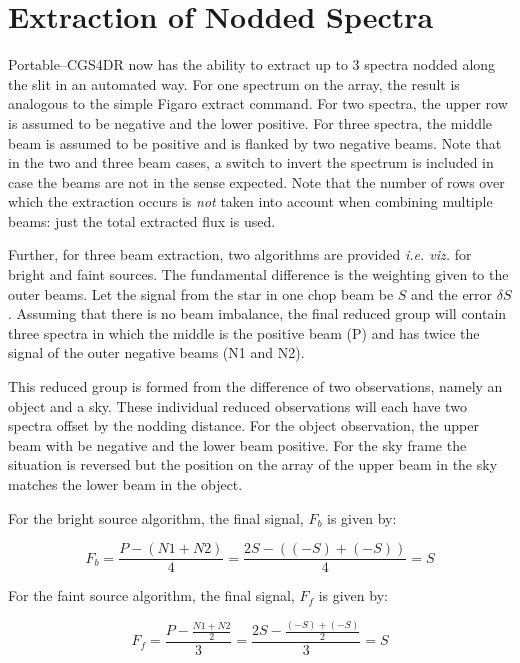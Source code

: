 \documentclass[a4paper]{book}
\renewcommand{\_}{{\tt\char'137}}
\begin{document}
\section{Extraction of Nodded Spectra}
Portable--CGS4DR now has the ability to extract up to 3 spectra nodded
along the slit in an automated way. For one spectrum on the array, the
result is analogous to the simple Figaro {\sc extract} command. For two
spectra, the upper row is assumed to be negative and the lower positive.
For three spectra, the middle beam is assumed to be positive and is
flanked by two negative beams. Note that in the two and three beam cases,
a switch to invert the spectrum is included in case the beams are not in
the sense expected.  Note that the number of rows over which the extraction
occurs is {\em not} taken into account when combining multiple beams: just
the total extracted flux is used.

Further, for three beam extraction, two algorithms are provided {\em i.e.
viz.} for bright and faint sources. The fundamental difference is the
weighting given to the outer beams. Let the signal from the star in one
chop beam be $S$ and the error $\delta S$. Assuming that there is no beam
imbalance, the final reduced group will contain three spectra in which the
middle is the positive beam (P) and has twice the signal of the outer
negative beams (N1 and N2). 

This reduced group is formed from the difference of two observations,
namely an {\sc object} and a {\sc sky}. These individual reduced
observations will each have two spectra offset by the nodding distance.
For the {\sc object} observation, the upper beam with be negative and the
lower beam positive. For the {\sc sky} frame the situation is reversed but
the position on the array of the upper beam in the {\sc sky} matches the
lower beam in the {\sc object}. 

For the bright source algorithm, the final signal, $F_{b}$ is given by:

\begin{equation}
  F_{b} = \frac{P-(N1+N2)}{4} = \frac{2S-((-S)+(-S))}{4} = S
\label{equation_8}
\end{equation}

For the faint source algorithm, the final signal, $F_{f}$ is given by:

\begin{equation}
  F_{f} = \frac{ P-\frac{ N1+N2 }{ 2 } }{ 3 } =
   \frac{2S-\frac{ (-S)+(-S) }{ 2 }}{ 3 } = S
\label{equation_9}
\end{equation}
\end{document}

